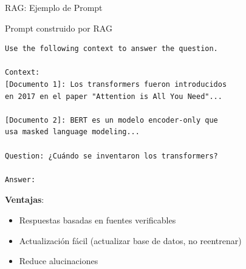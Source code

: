 \begin{frame}[fragile]{RAG: Ejemplo de Prompt}

\begin{block}{Prompt construido por RAG}
\small
\begin{verbatim}
Use the following context to answer the question.

Context:
[Documento 1]: Los transformers fueron introducidos 
en 2017 en el paper "Attention is All You Need"...

[Documento 2]: BERT es un modelo encoder-only que 
usa masked language modeling...

Question: ¿Cuándo se inventaron los transformers?

Answer:
\end{verbatim}
\end{block}

\vspace{0.5em}

\textbf{Ventajas}:
\begin{itemize}
    \item Respuestas basadas en fuentes verificables
    \item Actualización fácil (actualizar base de datos, no reentrenar)
    \item Reduce alucinaciones
\end{itemize}

\end{frame}

